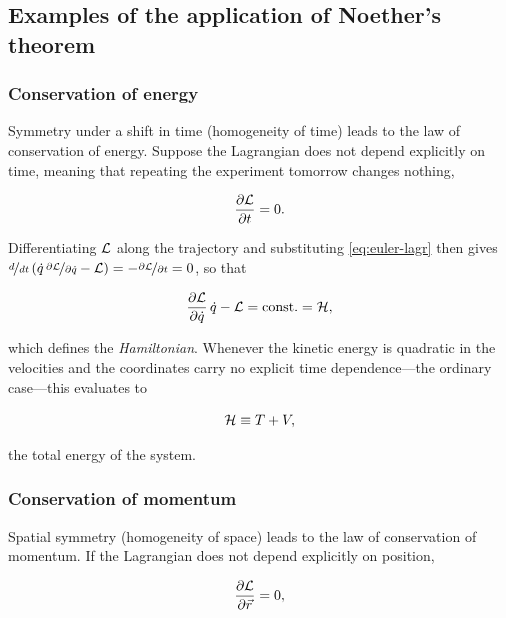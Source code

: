     \subsection{Examples of the application of Noether's theorem}

        \subsubsection{Conservation of energy}

            Symmetry under a shift in time (homogeneity of time) leads to the law of conservation of energy. Suppose the Lagrangian does not depend explicitly on time, meaning that repeating the experiment tomorrow changes nothing,

            \begin{equation*}
                \frac{\partial \mathcal{L}}{\partial t} = 0 .
            \end{equation*}

            Differentiating $\mathcal{L}$ along the trajectory and substituting \cref{eq:euler-lagr} then gives $\nicefrac{d}{dt}\left(\dot{q}\,\nicefrac{\partial \mathcal{L}}{\partial \dot{q}} - \mathcal{L}\right) = -\nicefrac{\partial \mathcal{L}}{\partial t} = 0$, so that

            \begin{equation*}
                \frac{\partial \mathcal{L}}{\partial \dot{q}}\,\dot{q} - \mathcal{L} = \mathrm{const.} = \mathcal{H},
            \end{equation*}

            which defines the \emph{Hamiltonian}. Whenever the kinetic energy is quadratic in the velocities and the coordinates carry no explicit time dependence---the ordinary case---this evaluates to

            \begin{equation}\label{eq:hamiltonian}
                \Ham \equiv T + V,
            \end{equation}

            the total energy of the system.

        \subsubsection{Conservation of momentum}

            Spatial symmetry (homogeneity of space) leads to the law of conservation of momentum. If the Lagrangian does not depend explicitly on position,

            \begin{equation*}
                \frac{\partial \mathcal{L}}{\partial \vec{r}} = 0,
            \end{equation*}

